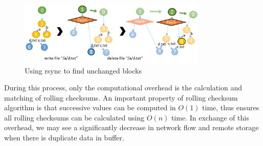 \begin{figure}[hbtp]
\centering
\includegraphics[width=0.8\textwidth]{Chapter-4/figs/fig26.png}
\caption{Using rsync to find unchanged blocks}
\label{fig:rsync}
\end{figure}


	During this process, only the computational overhead is the calculation and matching of rolling checksums. An important property of rolling checksum algorithm is that successive values can be computed in $O(1)$ time, thus ensures all rolling checksums can be calculated using $O(n)$ time. In exchange of this overhead, we may see a significantly decrease in network flow and remote storage when there is duplicate data in buffer.
